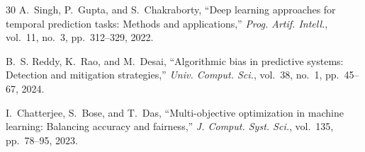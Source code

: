 \documentclass[conference]{IEEEtran}
\begin{document}
\begin{thebibliography}{30}
A.~Singh, P.~Gupta, and S.~Chakraborty, ``Deep learning approaches for temporal prediction tasks: Methods and applications,'' \textit{Prog. Artif. Intell.}, vol.~11, no.~3, pp.~312--329, 2022.

B.~S. Reddy, K.~Rao, and M.~Desai, ``Algorithmic bias in predictive systems: Detection and mitigation strategies,'' \textit{Univ. Comput. Sci.}, vol.~38, no.~1, pp.~45--67, 2024.

I.~Chatterjee, S.~Bose, and T.~Das, ``Multi-objective optimization in machine learning: Balancing accuracy and fairness,'' \textit{J. Comput. Syst. Sci.}, vol.~135, pp.~78--95, 2023.

\end{thebibliography}
\end{document}
